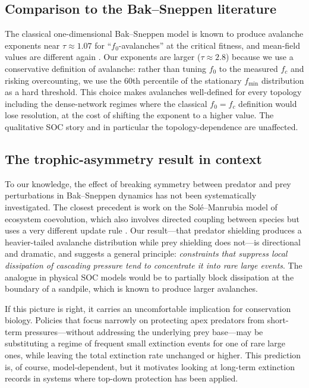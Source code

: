 \documentclass[11pt,a4paper]{article}
\begin{document}
\subsection{Comparison to the Bak--Sneppen literature}
The classical one-dimensional Bak--Sneppen model is known to produce avalanche exponents near $\tau \approx 1.07$ for ``$f_0$-avalanches'' at the critical fitness, and mean-field values are different again \citep{bak1993punctuated}. Our exponents are larger ($\tau \approx 2.8$) because we use a conservative definition of avalanche: rather than tuning $f_0$ to the measured $f_c$ and risking overcounting, we use the 60th percentile of the stationary $f_{\min}$ distribution as a hard threshold. This choice makes avalanches well-defined for every topology including the dense-network regimes where the classical $f_0 = f_c$ definition would lose resolution, at the cost of shifting the exponent to a higher value. The qualitative SOC story and in particular the topology-dependence are unaffected.

\subsection{The trophic-asymmetry result in context}
To our knowledge, the effect of breaking symmetry between predator and prey perturbations in Bak--Sneppen dynamics has not been systematically investigated. The closest precedent is work on the Sol\'e--Manrubia model of ecosystem coevolution, which also involves directed coupling between species but uses a very different update rule \citep{sole1996extinction}. Our result---that predator shielding produces a heavier-tailed avalanche distribution while prey shielding does not---is directional and dramatic, and suggests a general principle: \emph{constraints that suppress local dissipation of cascading pressure tend to concentrate it into rare large events}. The analogue in physical SOC models would be to partially block dissipation at the boundary of a sandpile, which is known to produce larger avalanches.

If this picture is right, it carries an uncomfortable implication for conservation biology. Policies that focus narrowly on protecting apex predators from short-term pressures---without addressing the underlying prey base---may be substituting a regime of frequent small extinction events for one of rare large ones, while leaving the total extinction rate unchanged or higher. This prediction is, of course, model-dependent, but it motivates looking at long-term extinction records in systems where top-down protection has been applied.
\end{document}
